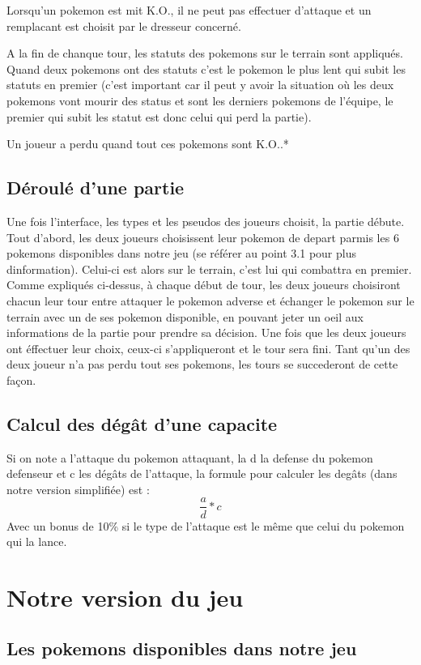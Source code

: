 	Lorsqu'un pokemon est mit K.O., il ne peut pas effectuer d'attaque et un remplacant est choisit par le dresseur concerné.
	
	A la fin de chanque tour, les statuts des pokemons sur le terrain sont appliqués. Quand deux pokemons ont des statuts c'est le pokemon le plus lent qui subit les statuts en premier (c'est important car il peut y avoir la situation où les deux pokemons vont mourir des status et sont les derniers pokemons de l'équipe, le premier qui subit les statut est donc celui qui perd la partie).
	
	Un joueur a perdu quand tout ces pokemons sont K.O..*
        \subsection{Déroulé d'une partie}
        Une fois l'interface, les types et les pseudos des joueurs choisit, la partie débute. Tout d'abord, les deux joueurs choisissent leur pokemon de depart parmis les 6 pokemons disponibles dans notre jeu (se référer au point 3.1 pour plus dinformation). Celui-ci est alors sur le terrain, c'est lui qui combattra en premier. 
        Comme expliqués ci-dessus, à chaque début de tour, les deux joueurs choisiront chacun leur tour entre attaquer le pokemon adverse et échanger le pokemon sur le terrain avec un de ses pokemon disponible, en pouvant jeter un oeil aux informations de la partie pour prendre sa décision. 
        Une fois que les deux joueurs ont éffectuer leur choix, ceux-ci s'appliqueront et le tour sera fini.
        Tant qu'un des deux joueur n'a pas perdu tout ses pokemons, les tours se succederont de cette façon.


 
	\subsection{Calcul des dégât d'une capacite}
		Si on note a l'attaque du pokemon attaquant, la d la defense du pokemon defenseur et c les dégâts de l'attaque, la formule pour calculer les degâts (dans notre version 					simplifiée) est  :
		\[
			\frac{a}{d} * c
		\]
		Avec un bonus de 10\% si le type de l'attaque est le même que celui du pokemon qui la lance.
\section{Notre version du jeu}
	\subsection{Les pokemons disponibles dans notre jeu}
